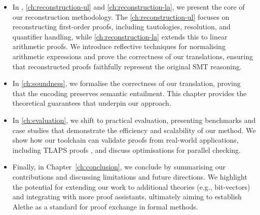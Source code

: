 \begin{itemize}
\item In , \ref{ch:reconstruction-ul} and \ref{ch:reconstruction-la}, we present the core of our reconstruction methodology.
    The \cref{ch:reconstruction-ul} focuses on reconstructing first-order proofs, including tautologies, resolution, and quantifier handling, while \cref{ch:reconstruction-la} extends this to linear arithmetic proofs.
    We introduce reflective techniques for normalising arithmetic expressions and prove the correctness of our translations, ensuring that reconstructed proofs faithfully represent the original SMT reasoning.

\item In \cref{ch:soundness}, we formalise the correctness of our translation, proving that the encoding preserves semantic entailment.
    This chapter provides the theoretical guarantees that underpin our approach.

\item In \cref{ch:evaluation}, we shift to practical evaluation, presenting benchmarks and case studies that demonstrate the efficiency and scalability of our method.
    We show how our toolchain can validate proofs from real-world applications, including TLAPS proofs \cite{tla-proofs}, and discuss optimisations for parallel checking.

\item Finally, in Chapter~\cref{ch:conclusion}, we conclude by summarising our contributions and discussing limitations and future directions.
    We highlight the potential for extending our work to additional theories (e.g., bit-vectors) and integrating with more proof assistants, ultimately aiming to establish Alethe as a standard for proof exchange in formal methods.
\end{itemize}
